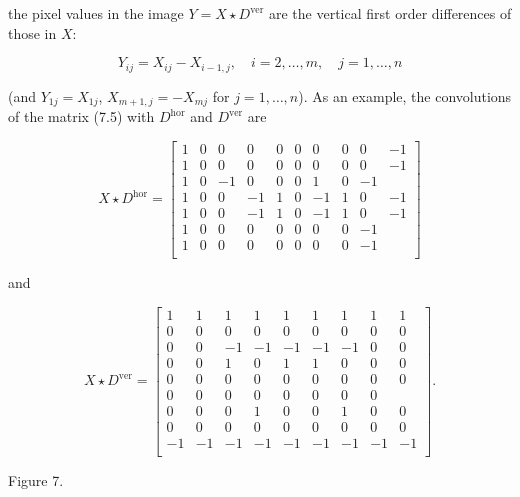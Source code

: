 the pixel values in the image \(Y=X\star D^{\text{ver}}\) are the vertical first order differences of those in \(X\):

\[Y_{ij}=X_{ij}-X_{i-1,j},\quad i=2,\dots,m,\quad j=1,\dots,n\]

(and \(Y_{1j}=X_{1j}\), \(X_{m+1,j}=-X_{mj}\) for \(j=1,\dots,n\)). As an example, the convolutions of the matrix (7.5) with \(D^{\text{hor}}\) and \(D^{\text{ver}}\) are

\[X\star D^{\text{hor}}=\left[\begin{array}{cccccccccc}1&0&0&0&0&0&0&0&0&-1\\ 1&0&0&0&0&0&0&0&0&-1\\ 1&0&-1&0&0&0&1&0&-1\\ 1&0&0&-1&1&0&-1&1&0&-1\\ 1&0&0&-1&1&0&-1&1&0&-1\\ 1&0&0&0&0&0&0&0&-1\\ 1&0&0&0&0&0&0&0&-1\\ \end{array}\right]\]

and

\[X\star D^{\text{ver}}=\left[\begin{array}{cccccccccc}1&1&1&1&1&1&1&1&1\\ 0&0&0&0&0&0&0&0&0\\ 0&0&-1&-1&-1&-1&-1&0&0\\ 0&0&1&0&1&1&0&0&0\\ 0&0&0&0&0&0&0&0&0\\ 0&0&0&0&0&0&0&0\\ 0&0&0&1&0&0&1&0&0\\ 0&0&0&0&0&0&0&0&0\\ -1&-1&-1&-1&-1&-1&-1&-1&-1\\ \end{array}\right].\]

Figure 7.

 